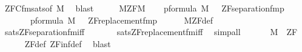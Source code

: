 \begin{isabellebody}
\ ZFC{\isacharunderscore}{\kern0pt}fm{\isacharunderscore}{\kern0pt}sats{\isacharbrackleft}{\kern0pt}of\ M{\isacharbrackright}{\kern0pt}\ \isamarkupfalse%
\ blast\isanewline
\ \ \isamarkupfalse%
\ \isamarkupfalse%
\ {\isacartoucheopen}M{\isacharunderscore}{\kern0pt}ZF{\isacharparenleft}{\kern0pt}M{\isacharparenright}{\kern0pt}{\isacartoucheclose}\isanewline
\ \ \isamarkupfalse%
\ {\isachardoublequoteopen}{\isasymforall}p{\isasymin}formula{\isachardot}{\kern0pt}\ {\isacharparenleft}{\kern0pt}M{\isacharcomma}{\kern0pt}\ {\isacharbrackleft}{\kern0pt}{\isacharbrackright}{\kern0pt}\ {\isasymTurnstile}\ {\isacharparenleft}{\kern0pt}ZF{\isacharunderscore}{\kern0pt}separation{\isacharunderscore}{\kern0pt}fm{\isacharparenleft}{\kern0pt}p{\isacharparenright}{\kern0pt}{\isacharparenright}{\kern0pt}{\isacharparenright}{\kern0pt}{\isachardoublequoteclose}\ \isanewline
\ \ \ \ \ \ \ {\isachardoublequoteopen}{\isasymforall}p{\isasymin}formula{\isachardot}{\kern0pt}\ {\isacharparenleft}{\kern0pt}M{\isacharcomma}{\kern0pt}\ {\isacharbrackleft}{\kern0pt}{\isacharbrackright}{\kern0pt}\ {\isasymTurnstile}\ {\isacharparenleft}{\kern0pt}ZF{\isacharunderscore}{\kern0pt}replacement{\isacharunderscore}{\kern0pt}fm{\isacharparenleft}{\kern0pt}p{\isacharparenright}{\kern0pt}{\isacharparenright}{\kern0pt}{\isacharparenright}{\kern0pt}{\isachardoublequoteclose}\isanewline
\ \ \ \ \isamarkupfalse%
\ M{\isacharunderscore}{\kern0pt}ZF{\isacharunderscore}{\kern0pt}def\ \isamarkupfalse%
\ sats{\isacharunderscore}{\kern0pt}ZF{\isacharunderscore}{\kern0pt}separation{\isacharunderscore}{\kern0pt}fm{\isacharunderscore}{\kern0pt}iff\ \isanewline
\ \ \ \ \ \ sats{\isacharunderscore}{\kern0pt}ZF{\isacharunderscore}{\kern0pt}replacement{\isacharunderscore}{\kern0pt}fm{\isacharunderscore}{\kern0pt}iff\ \isamarkupfalse%
\ simp{\isacharunderscore}{\kern0pt}all\isanewline
\ \ \isamarkupfalse%
\isanewline
\ \ \isamarkupfalse%
\ {\isachardoublequoteopen}M\ {\isasymTurnstile}\ ZF{\isachardoublequoteclose}\isanewline
\ \ \ \ \isamarkupfalse%
\ ZF{\isacharunderscore}{\kern0pt}def\ ZF{\isacharunderscore}{\kern0pt}inf{\isacharunderscore}{\kern0pt}def\ \isamarkupfalse%
\ blast\isanewline
{}\isamarkupfalse%
%
\endisatagproof
{\isafoldproof}%
%
\isadelimproof
\isanewline
%
\endisadelimproof
%
\isadelimtheory
\isanewline
%
\endisadelimtheory
%
\isatagtheory
{}\isamarkupfalse%
%
\endisatagtheory
{\isafoldtheory}%
%
\isadelimtheory
%
\endisadelimtheory
%
\end{isabellebody}%
